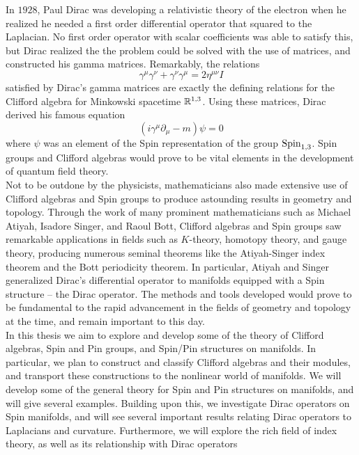 In $1928$, Paul Dirac was developing a relativistic theory of the electron
when he realized he needed a first order differential operator that squared
to the Laplacian. No first order operator with scalar coefficients was able
to satisfy this, but Dirac realized the the problem could be solved with
the use of matrices, and constructed his gamma matrices. Remarkably, the
relations
\[
\gamma^\mu\gamma^\nu + \gamma^\nu\gamma^\mu = 2\eta^{\mu\nu}I
\]
satisfied by Dirac's gamma matrices are exactly the defining relations for the
Clifford algebra for Minkowski spacetime $\mathbb{R}^{1,3}$. Using these matrices, Dirac
derived his famous equation
\[
(i\gamma^\mu\partial_\mu -m)\psi = 0
\]
where $\psi$ was an element of the Spin representation of the group $\mathrm{Spin}_{1,3}$.
Spin groups and Clifford algebras would prove to be vital elements in the development
of quantum field theory. \\

Not to be outdone by the physicists, mathematicians also made extensive use
of Clifford algebras and Spin groups to produce astounding results in geometry
and topology. Through the work of many prominent mathematicians such as Michael
Atiyah, Isadore Singer, and Raoul Bott, Clifford algebras and Spin groups saw
remarkable applications in fields such as $K$-theory, homotopy theory, and
gauge theory, producing numerous seminal theorems like the Atiyah-Singer index
theorem and the Bott periodicity theorem. In particular, Atiyah and Singer
generalized Dirac's differential operator to manifolds equipped with a Spin
structure -- the Dirac operator. The methods and tools developed would prove
to be fundamental to the rapid advancement in the fields of geometry and topology
at the time, and remain important to this day. \\

In this thesis we aim to explore and develop some of the theory of
Clifford algebras, Spin and Pin groups, and Spin/Pin structures on manifolds.
In particular, we plan to construct and classify Clifford algebras and their
modules, and transport these constructions to the nonlinear world of manifolds.
We will develop some of the general theory for Spin and Pin structures on manifolds,
and will give several examples. Building upon this, we investigate Dirac operators on
Spin manifolds, and will see several important results relating Dirac operators
to Laplacians and curvature. Furthermore, we will explore the rich field of
index theory, as well as its relationship with Dirac operators
%
